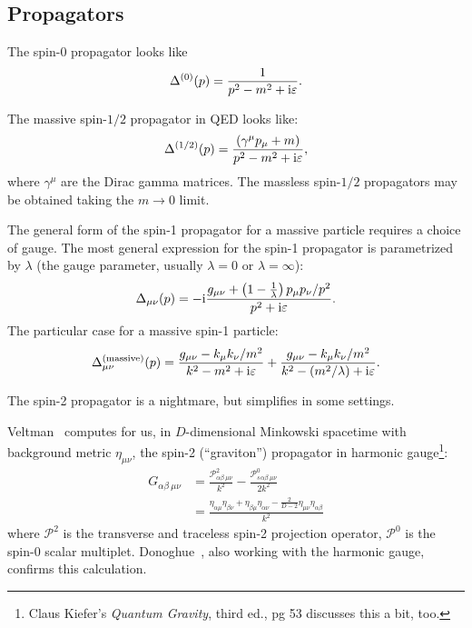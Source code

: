 \subsection{Propagators}

The spin-0 propagator looks like
\begin{equation}
\Delta^{(0)}(p) = \frac{1}{p^{2} - m^{2} + \mathrm{i}\varepsilon}.
\end{equation}


The massive spin-$1/2$ propagator in QED looks like:
\begin{equation}
\Delta^{(1/2)}(p) = \frac{(\gamma^{\mu}p_{\mu}+m)}{p^{2}-m^{2}+\mathrm{i}\varepsilon},
\end{equation}
where $\gamma^{\mu}$ are the Dirac gamma matrices. The massless
spin-$1/2$ propagators may be obtained taking the $m\to0$ limit.

The general form of the spin-1 propagator for a massive particle
requires a choice of gauge. The most general expression for the spin-1
propagator is parametrized by $\lambda$ (the gauge parameter, usually
$\lambda=0$ or $\lambda=\infty$):
\begin{equation}
\Delta_{\mu\nu}(p) = -\mathrm{i}\frac{g_{\mu\nu} + \left(1 - \frac{1}{\lambda}\right)p_{\mu}p_{\nu}/p^{2}}{p^{2}+\mathrm{i}\varepsilon}.
\end{equation}
The particular case for a massive spin-1 particle:
\begin{equation}
\Delta^{\text{(massive)}}_{\mu\nu}(p) = \frac{g_{\mu\nu} - k_{\mu}k_{\nu}/m^{2}}{k^{2}-m^{2}+\mathrm{i}\varepsilon}
+\frac{g_{\mu\nu} - k_{\mu}k_{\nu}/m^{2}}{k^{2}-(m^{2}/\lambda)+\mathrm{i}\varepsilon}.
\end{equation}

The spin-2 propagator is a nightmare, but simplifies in some settings.

Veltman~\cite[see Eq~(11)]{Veltman:1975vx} computes for us,
in $D$-dimensional Minkowski spacetime with background metric
$\eta_{\mu\nu}$, the spin-2 (``graviton'') propagator in harmonic
gauge\footnote{Claus Kiefer's \emph{Quantum Gravity}, third ed., pg 53
discusses this a bit, too.}:
\begin{subequations}
\begin{align}
G_{\alpha\beta~\mu\nu} &= \frac{\mathcal{P}^{2}_{\alpha\beta~\mu\nu}}{k^{2}} - \frac{\mathcal{P}^{0}_{s}{}_{\alpha\beta~\mu\nu}}{2k^{2}}\\
&= \frac{\eta_{\alpha\mu}\eta_{\beta\nu}+\eta_{\beta\mu}\eta_{\alpha\nu}-\frac{2}{D-2}\eta_{\mu\nu}\eta_{\alpha\beta}}{k^{2}}
\end{align}
\end{subequations}
where $\mathcal{P}^{2}$ is the transverse and traceless spin-2
projection operator, $\mathcal{P}^{0}$ is the spin-0 scalar multiplet.
Donoghue~\cite[see Eq (39)]{Donoghue:1995cz}, also working with the harmonic gauge, confirms this calculation.

